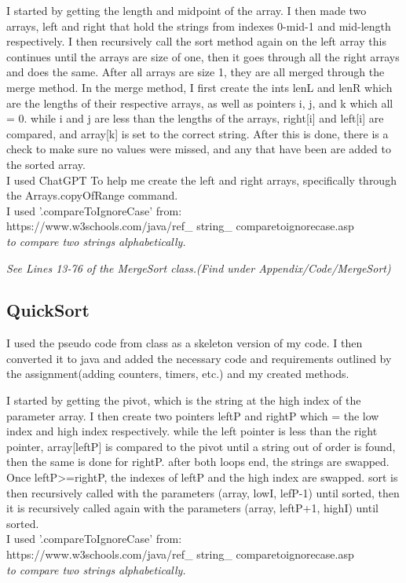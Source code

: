 \documentclass[10pt]{article}
\begin{document}
I started by getting the length and midpoint of the array.
I then made two arrays, left and right that hold the strings from indexes 0-mid-1 and mid-length respectively. I then recursively call the sort method again on the left array this continues until the arrays are size of one, then it goes through all the right arrays and does the same. After all arrays are size 1, they are all merged through the merge method. In the merge method, I first create the ints lenL and lenR which are the lengths of their respective arrays, as well as pointers i, j, and k which all = 0. while i and j are less than the lengths of the arrays, right[i] and left[i] are compared, and array[k] is set to the correct string. After this is done, there is a check to make sure no values were missed, and any that have been are added to the sorted array.
\\
\newline
I used ChatGPT To help me create the left and right arrays, specifically through the Arrays.copyOfRange command.
\\
\newline
I used '.compareToIgnoreCase' from:
\\
https://www.w3schools.com/java/ref_ string_ comparetoignorecase.asp
\\
\emph{\normalfont to compare two strings alphabetically.}
\newline

\emph{\normalfont 
See Lines 13-76 of the MergeSort class.(Find under Appendix/Code/MergeSort)}

\subsection{QuickSort}
I used the pseudo code from class as a skeleton version of my code. I then converted it to java and added the necessary code and requirements outlined by the assignment(adding counters, timers, etc.) and my created methods.

I started by getting the pivot, which is the string at the high index of the parameter array. I then create two pointers leftP and rightP which = the low index and high index respectively. while the left pointer is less than the right pointer, array[leftP] is compared to the pivot until a string out of order is found, then the same is done for rightP. after both loops end, the strings are swapped. Once leftP>=rightP, the indexes of leftP and the high index are swapped. sort is then recursively called with the parameters (array, lowI, lefP-1) until sorted, then it is recursively called again with the parameters (array, leftP+1, highI) until sorted.
\\
\newline
I used '.compareToIgnoreCase' from:
\\
https://www.w3schools.com/java/ref_ string_ comparetoignorecase.asp
\\
\emph{\normalfont to compare two strings alphabetically.}
\newline
\end{document}
